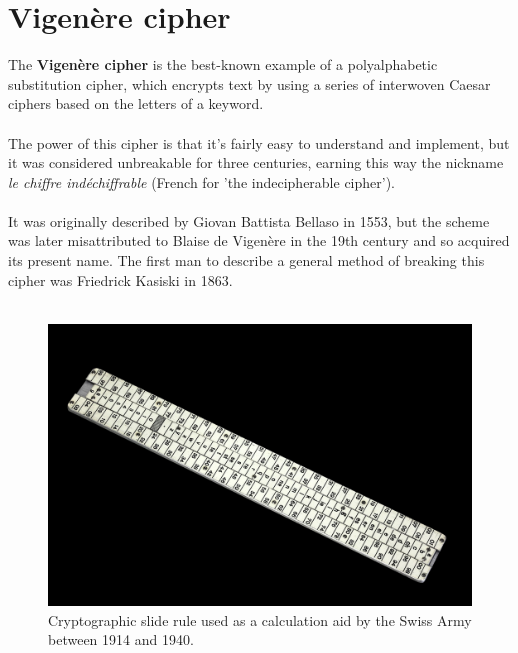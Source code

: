 \documentclass[Lau,binding=0.6cm,oneside]{sapthesis}
\begin{document}
\section{Vigenère cipher}
The \textbf{Vigenère cipher} is the best-known example of a polyalphabetic substitution cipher, which encrypts text by using a series of interwoven Caesar ciphers based on the letters of a keyword\supercite{vigenere1}.\\\\
The power of this cipher is that it's fairly easy to understand and implement, but it was considered unbreakable for three centuries\supercite{vigenere2}, earning this way the nickname \textit{le chiffre indéchiffrable} (French for 'the indecipherable cipher').\\\\
It was originally described by Giovan Battista Bellaso in 1553, but the scheme was later misattributed to Blaise de Vigenère in the 19th century and so acquired its present name. The first man to describe a general method of breaking this cipher was Friedrick Kasiski in 1863.\\\\

\begin{figure}[H]
\includegraphics[scale=0.13]{slide_rule}
\centering
\caption{Cryptographic slide rule used as a calculation aid by the Swiss Army between 1914 and 1940.}
\centering
\end{figure}
\end{document}
